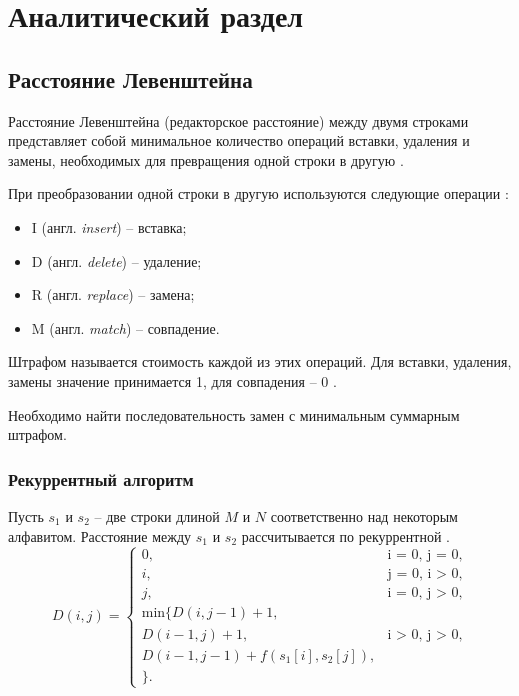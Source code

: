 \chapter{Аналитический раздел}
\section{Расстояние Левенштейна}
Расстояние Левенштейна (редакторское расстояние) между двумя строками представляет собой минимальное количество операций вставки, удаления и замены, необходимых для превращения одной строки в другую \cite{levenstein}.

При преобразовании одной строки в другую используются следующие операции \cite{levenstein}:

\begin{itemize}
	\item I (англ. \textit{insert}) -- вставка;
	\item D (англ. \textit{delete}) -- удаление;
	\item R (англ. \textit{replace}) -- замена;
	\item M (англ. \textit{match}) -- совпадение.
\end{itemize}

Штрафом называется стоимость каждой из этих операций. Для вставки, удаления, замены значение принимается 1, для совпадения -- 0 \cite{levenstein}.  

Необходимо найти последовательность замен с минимальным суммарным штрафом.

\subsection{Рекуррентный алгоритм}
Пусть $s_{1}$ и $s_{2}$ -- две строки длиной $M$ и $N$ соответственно над некоторым алфавитом. Расстояние между $s_{1}$ и $s_{2}$ рассчитывается по рекуррентной .
\begin{equation}
	\label{eq:leven_recur}
	D(i, j) =
	\begin{cases}
		0, &\text{i = 0, j = 0,}\\
		i, &\text{j = 0, i > 0,}\\
		j, &\text{i = 0, j > 0,}\\
		\text{min}  \lbrace
		D(i, j - 1) + 1,\\
		D(i - 1, j) + 1, &\text{i > 0, j > 0,}\\
		D(i - 1, j - 1) +  f(s_{1}[i], s_{2}[j]), \\
		\rbrace.
		
	\end{cases}
\end{equation}


